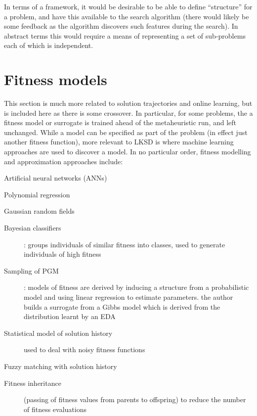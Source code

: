 \documentclass[a4paper]{article}
\begin{document}
In terms of a framework, it would be desirable to be able to define ``structure'' for a problem, and have this available to the search algorithm (there would likely be some feedback as the algorithm discovers such features during the search).
In abstract terms this would require a means of representing a set of sub-problems each of which is independent.

\section{Fitness models}
This section is much more related to solution trajectories and online learning, but is included here as there is some crossover.
In particular, for some problems, the a fitness model or surrogate is trained ahead of the metaheuristic run, and left unchanged.
While a model can be specified as part of the problem (in effect just another fitness function), more relevant to LKSD is where machine learning approaches are used to discover a model.
In no particular order, fitness modelling and approximation approaches include:

\begin{description}
  \item[Artificial neural networks (ANNs)] \cite{Ochoa1997,Jin:04b,Syberfeldt2008,Li2008,Furtuna2011}
  \item[Polynomial regression] \cite{Zhou2005}
  \item[Gaussian random fields] \cite{Emmerich2006}
  \item[Bayesian classifiers] \cite{Miquelez_et_al:2004}: groups individuals of similar fitness into classes, used to generate individuals of high fitness
  \item[Sampling of PGM] \cite{Sastry2006}: models of fitness are derived by inducing a structure from a probabilistic model and using linear regression to estimate parameters. \cite{Ochoa2010} the author builds a surrogate from a Gibbs model which is derived from the distribution learnt by an EDA
  \item[Statistical model of solution history] \cite{Takahashi2003,Sano2002} used to deal with noisy fitness functions
  \item[Fuzzy matching with solution history] \cite{Davarynejad2010}
  \item[Fitness inheritance] (passing of fitness values from parents to offspring) to reduce the number of fitness evaluations \cite{Chen2002,Pelikan2004a,Smith1995,Bui2005}
\end{description}
\end{document}
